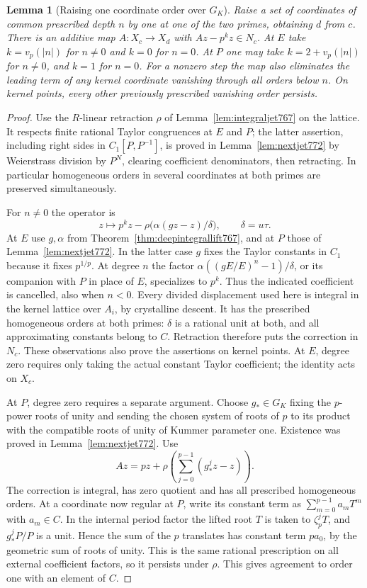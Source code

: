 \documentclass[a4paper,11pt]{article}
\newtheorem{lemma}[proposition]{Lemma}
\theoremstyle{definition}
\theoremstyle{remark}
\numberwithin{equation}{section}
\begin{document}
\begin{lemma}[Raising one coordinate order over \(G_K\)]
\leavevmode\label{lem:operators797}
Raise a set of coordinates of common prescribed depth \(n\)
by one at one of the two primes, obtaining \(d\) from \(c\).
There is an additive map \(A:X_c\to X_d\) with
\(A z-p^k z\in N_c\). At \(E\) take \(k=v_p(|n|)\) for
\(n\ne0\) and \(k=0\) for \(n=0\). At \(P\) one may take
\(k=2+v_p(|n|)\) for \(n\ne0\), and \(k=1\) for \(n=0\).
For a nonzero step the map also eliminates the leading term
of any kernel coordinate vanishing through all orders below
\(n\). On kernel points, every other previously prescribed
vanishing order persists.
\end{lemma}
\begin{proof}
Use the \(R\)-linear retraction \(\rho\) of
Lemma~\ref{lem:integraljet767} on the lattice. It respects
finite rational Taylor congruences at \(E\) and \(P\);
the latter assertion, including right sides in \(C_1[P,P^{-1}]\),
is proved in Lemma~\ref{lem:nextjet772} by Weierstrass division
by \(P^N\), clearing coefficient denominators, then retracting.
In particular homogeneous orders in several coordinates at
both primes are preserved simultaneously.

For \(n\ne0\) the operator is
\[
         z\longmapsto p^k z-
             \rho\bigl(\alpha(gz-z)/\delta\bigr),\qquad \delta=u\tau.
\]
At \(E\) use \(g,\alpha\) from Theorem~\ref{thm:deepintegrallift767},
and at \(P\) those of Lemma~\ref{lem:nextjet772}. In the latter
case \(g\) fixes the Taylor constants in \(C_1\) because it
fixes \(p^{1/p}\). At degree \(n\) the factor
\(\alpha((gE/E)^n-1)/\delta\), or its companion with \(P\)
in place of \(E\), specializes to \(p^k\). Thus the indicated
coefficient is cancelled, also when \(n<0\). Every divided
displacement used here is integral in the kernel lattice
over \(A_i\), by crystalline descent. It has the prescribed
homogeneous orders at both primes: \(\delta\) is a rational
unit at both, and all approximating constants belong to
\(C\). Retraction therefore puts the correction in \(N_c\).
These observations also prove the assertions on kernel points.
At \(E\), degree zero requires only taking the actual constant
Taylor coefficient; the identity acts on \(X_c\).

At \(P\), degree zero requires a separate argument. Choose
\(g_*\in G_K\) fixing the \(p\)-power roots of unity and
sending the chosen system of roots of \(p\) to its product
with the compatible roots of unity of Kummer parameter one.
Existence was proved in Lemma~\ref{lem:nextjet772}. Use
\[
           A z=pz+\rho\left(\sum_{j=0}^{p-1}(g_*^jz-z)\right).
\]
The correction is integral, has zero quotient and has all
prescribed homogeneous orders. At a coordinate now regular at
\(P\), write its constant term as \(\sum_{m=0}^{p-1}a_m T^m\)
with \(a_m\in C\). In the internal period factor the lifted
root \(T\) is taken to \(\zeta_p^jT\), and \(g_*^jP/P\)
is a unit. Hence the sum of the \(p\) translates has constant
term \(pa_0\), by the geometric sum of roots of unity.
This is the same rational prescription on all external
coefficient factors, so it persists under \(\rho\). This
gives agreement to order one with an element of \(C\).
\end{proof}
\end{document}

